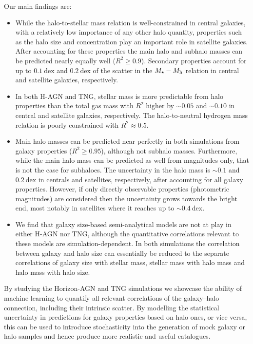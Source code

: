 \documentclass[usenatbib,useAMS]{mnras}
\begin{document}
Our main findings are:
\begin{itemize}
    \item While the halo-to-stellar mass relation is well-constrained in central galaxies, with a relatively low importance of any other halo quantity, properties such as the halo size and concentration play an important role in satellite galaxies. After accounting for these properties the main halo and subhalo masses can be predicted nearly equally well ($R^2 \geq 0.9$). Secondary properties account for up to $0.1~\mathrm{dex}$ and $0.2~\mathrm{dex}$ of the scatter in the $M_\star - M_{\rm h}$ relation in central and satellite galaxies, respectively.
    \item In both H-AGN and TNG, stellar mass is more predictable from halo properties than the total gas mass with $R^2$ higher by $\sim0.05$ and $\sim0.10$ in central and satellite galaxies, respectively. The halo-to-neutral hydrogen mass relation is poorly constrained with $R^2\approx0.5$.
    \item Main halo masses can be predicted near perfectly in both simulations from galaxy properties ($R^2 \geq 0.95$), although not subhalo masses. Furthermore, while the main halo mass can be predicted as well from magnitudes only, that is not the case for subhaloes. The uncertainty in the halo mass is $\sim0.1$ and $0.2~\mathrm{dex}$ in centrals and satellites, respectively, after accounting for all galaxy properties. However, if only directly observable properties (photometric magnitudes) are considered then the uncertainty grows towards the bright end, most notably in satellites where it reaches up to $\sim0.4~\mathrm{dex}$.
    \item We find that galaxy size-based semi-analytical models are not at play in either H-AGN nor TNG, although the quantitative correlations relevant to these models are simulation-dependent. In both simulations the correlation between galaxy and halo size can essentially be reduced to the separate correlations of galaxy size with stellar mass, stellar mass with halo mass and halo mass with halo size.
\end{itemize}

By studying the Horizon-AGN and TNG simulations we showcase the ability of machine learning to quantify all relevant correlations of the galaxy--halo connection, including their intrinsic scatter. By modelling the statistical uncertainty in predictions for galaxy properties based on halo ones, or vice versa, this can be used to introduce stochasticity into the generation of mock galaxy or halo samples and hence produce more realistic and useful catalogues.
\end{document}
